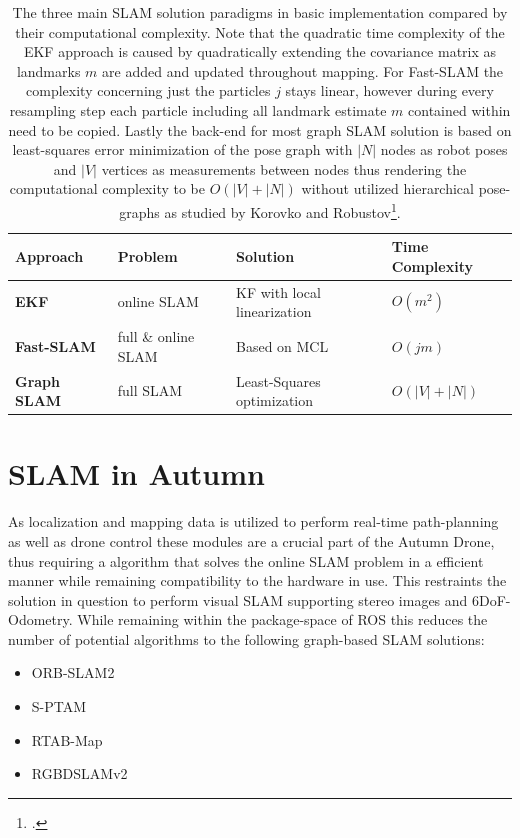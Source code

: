 \begin{table}[]
	\begin{tabular}{|l|l|l|l|}
		\hline
		\textbf{Approach}  & \textbf{Problem} & \textbf{Solution}                      & \textbf{Time Complexity} \\ \hline
		\textbf{EKF}       & online SLAM      & KF with local linearization & $O(m^{2})$               \\ \hline
		\textbf{Fast-SLAM} & full \& online SLAM      & Based on MCL     & $O(j m)$                 \\ \hline
		\textbf{Graph SLAM} & full  SLAM & Least-Squares optimization & $O(|V| + |N|)$ \\ \hline
	\end{tabular}
	\caption{The three main SLAM solution paradigms in basic implementation compared by their computational complexity. Note that the quadratic time complexity of the EKF approach is caused by quadratically extending the covariance matrix as landmarks $m$ are added and updated throughout mapping.
	For Fast-SLAM the complexity concerning just the particles $j$ stays linear, however during every resampling step each particle including all landmark estimate $m$ contained within need to be copied. 
	Lastly the back-end for most graph SLAM solution is based on least-squares error minimization of the pose graph with $|N|$ nodes as robot poses and $|V|$ vertices as measurements between nodes thus rendering the computational complexity to be  $O(|V| + |N|)$ without utilized hierarchical pose-graphs as studied by Korovko and Robustov\footcite{korovko2021partial}.
}
	\label{tab:slamComparison}
\end{table}

\section{SLAM in Autumn}
As localization and mapping data is utilized to perform real-time path-planning as well as drone control these modules are a crucial part of the Autumn Drone, thus requiring a algorithm that solves the online SLAM problem in a efficient manner while remaining compatibility to the hardware in use. This restraints the solution in question to perform visual SLAM supporting stereo images and 6DoF-Odometry. 
While remaining within the package-space of ROS this reduces the number of potential algorithms to the following graph-based SLAM solutions:
\begin{itemize}
	\item ORB-SLAM2
	\item S-PTAM
	\item RTAB-Map
	\item RGBDSLAMv2
\end{itemize}

